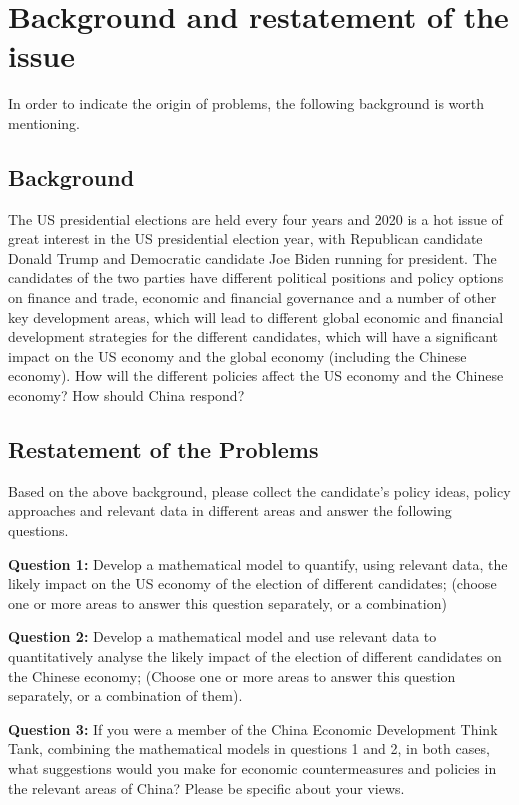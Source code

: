 \documentclass{apmcmthesis}
\begin{document}
\newpage
\tableofcontents


\newpage
\pagestyle{mainmatterstyle}
\setcounter{page}{1}

\section{Background and restatement of the issue}
In order to indicate the origin of problems, the following background is worth mentioning.
\subsection{Background}
The US presidential elections are held every four years and 2020 is a hot issue of great interest in the US presidential election year, with Republican candidate Donald Trump and Democratic candidate Joe Biden running for president. The candidates of the two parties have different political positions and policy options on finance and trade, economic and financial governance and a number of other key development areas, which will lead to different global economic and financial development strategies for the different candidates, which will have a significant impact on the US economy and the global economy (including the Chinese economy). How will the different policies affect the US economy and the Chinese economy? How should China respond?

\subsection{Restatement of the Problems}
Based on the above background, please collect the candidate's policy ideas, policy approaches and relevant data in different areas and answer the following questions.

\textbf{Question 1:}
Develop a mathematical model to quantify, using relevant data, the likely impact on the US economy of the election of different candidates; (choose one or more areas to answer this question separately, or a combination)

\textbf{Question 2:}
Develop a mathematical model and use relevant data to quantitatively analyse the likely impact of the election of different candidates on the Chinese economy; (Choose one or more areas to answer this question separately, or a combination of them).

\textbf{Question 3:}
If you were a member of the China Economic Development Think Tank, combining the mathematical models in questions 1 and 2, in both cases, what suggestions would you make for economic countermeasures and policies in the relevant areas of China? Please be specific about your views.
\end{document}
